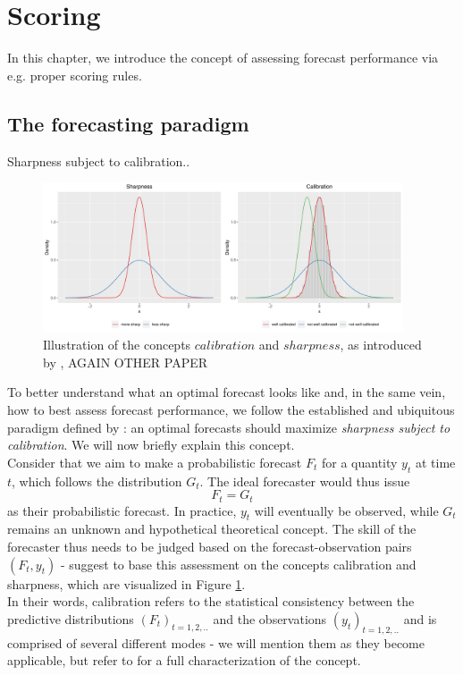 \section{Scoring}
In this chapter, we introduce the concept of assessing forecast performance via e.g. proper scoring rules.
\subsection{The forecasting paradigm}
Sharpness subject to calibration.\cite{ray_ensemble_2020}.
\begin{figure}
\centering
\includegraphics[width = 0.95\textwidth]{../plots/sharp_calib.pdf}
\caption{Illustration of the concepts $calibration$ and $sharpness$, as introduced by \cite{gneiting_strictly_2007}, AGAIN OTHER PAPER}
\label{fig:sharpcalib}
\end{figure}
To better understand what an optimal forecast looks like and, in the same vein, how to best assess forecast performance, we follow the established and ubiquitous paradigm defined by \cite{gneiting_probabilistic_2007}: an optimal forecasts should maximize \textit{sharpness subject to calibration}. We will now briefly explain this concept.\\
Consider that we aim to make a probabilistic forecast $F_t$ for a quantity $y_t$ at time $t$, which follows the distribution $G_t$. The ideal forecaster would thus issue 
\begin{equation}
	F_t = G_t
\end{equation}
as their probabilistic forecast. In practice, $y_t$ will eventually be observed, while $G_t$ remains an unknown and hypothetical theoretical concept. The skill of the forecaster thus needs to be judged based on the forecast-observation pairs $(F_t, y_t)$ - \cite{gneiting_probabilistic_2007} suggest to base this assessment on the concepts calibration and sharpness, which are visualized in Figure \ref{fig:sharpcalib}. \\
In their words, calibration refers to the statistical consistency between the predictive distributions $(F_t)_{t = 1,2,..}$ and the observations $(y_t)_{t = 1,2,..}$ and is comprised of several different modes - we will mention them as they become applicable, but refer to \cite{gneiting_probabilistic_2007} for a full characterization of the concept. %
